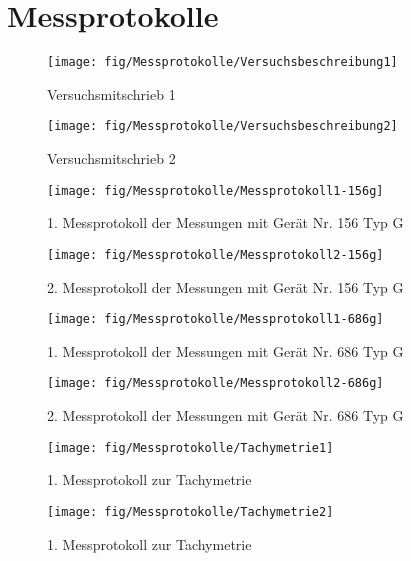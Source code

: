 \section{Messprotokolle}

\begin{figure}[!ht]
 \centering
 \texttt{[image: fig/Messprotokolle/Versuchsbeschreibung1]}
 \caption{Versuchsmitschrieb 1}
 \label{fig:mitschrieb1}
\end{figure}

\begin{figure}[!ht]
 \centering
 \texttt{[image: fig/Messprotokolle/Versuchsbeschreibung2]}
 \caption{Versuchsmitschrieb 2}
 \label{fig:mitschrieb2}
\end{figure}

\begin{figure}[!ht]
 \centering
 \texttt{[image: fig/Messprotokolle/Messprotokoll1-156g]}
 \caption{1. Messprotokoll der Messungen mit Gerät Nr. 156 Typ G}
 \label{fig:MP1_156}
\end{figure}

\begin{figure}[!ht]
 \centering
 \texttt{[image: fig/Messprotokolle/Messprotokoll2-156g]}
 \caption{2. Messprotokoll der Messungen mit Gerät Nr. 156 Typ G}
 \label{fig:MP2_156}
\end{figure}

\begin{figure}[!ht]
 \centering
 \texttt{[image: fig/Messprotokolle/Messprotokoll1-686g]}
 \caption{1. Messprotokoll der Messungen mit Gerät Nr. 686 Typ G}
 \label{fig:MP1_686}
\end{figure}

\begin{figure}[!ht]
 \centering
 \texttt{[image: fig/Messprotokolle/Messprotokoll2-686g]}
 \caption{2. Messprotokoll der Messungen mit Gerät Nr. 686 Typ G}
 \label{fig:MP2_686}
\end{figure}

\begin{figure}[!ht]
 \centering
 \texttt{[image: fig/Messprotokolle/Tachymetrie1]}
 \caption{1. Messprotokoll zur Tachymetrie}
 \label{fig:MPTachymetrie1}
\end{figure}

\begin{figure}[!ht]
 \centering
 \texttt{[image: fig/Messprotokolle/Tachymetrie2]}
 \caption{1. Messprotokoll zur Tachymetrie}
 \label{fig:MPTachymetrie2}
\end{figure}

